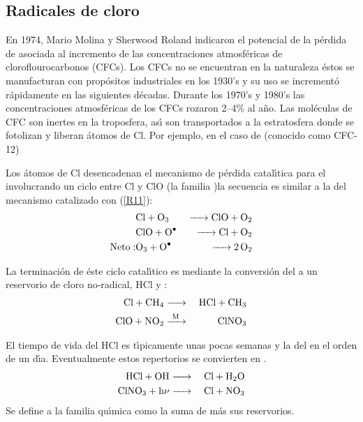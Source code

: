 \subsection{Radicales de cloro}\label{rclo}
En 1974, Mario Molina y Sherwood Roland indicaron el potencial de la p\'erdida de  asociada al incremento de las concentraciones atmosf\'ericas de cloroflourocarbonos (CFCs). Los CFCs no se encuentran en la naturaleza \'estos se manufacturan con prop\'ositos industriales en los 1930's  y su uso se increment\'o r\'apidamente en las siguientes d\'ecadas. Durante los 1970's y 1980's las concentraciones atmosf\'ericas de los CFCs rozaron 2--4\% al a\~no. Las mol\'eculas de CFC son inertes en la troposfera,  as\'{\i} son transportados a la estratosfera donde se fotolizan y liberan \'atomos de Cl. Por ejemplo, en el caso de  (conocido como CFC-12) 

Los \'atomos de Cl  desencadenan el mecanismo de p\'erdida catal\'{\i}tica para el  involucrando un ciclo entre Cl y ClO (la familia )la secuencia es similar a la del mecanismo catalizado con  (\ref{R11}):
\begin{eqnarray*}
            & \ce{Cl + O3     &->   ClO + O2}  \\
            &\ce{ClO +  O^.   & ->   Cl + O2 }  \\
  \mathrm{Neto: } &\ce{O3 + O^.   &->  2O2} 
\end{eqnarray*}

La terminaci\'on de \'este ciclo catal\'{\i}tico es mediante la conversi\'on del  a un reservorio de cloro no-radical, HCl y :
\begin{eqnarray*}
 \ce{Cl + CH4   & ->   & HCl + CH3 \\
       ClO + NO2        &  ->[M]  & ClNO3}
\end{eqnarray*}

El tiempo de vida del HCl es t\'{\i}picamente unas pocas semanas y la del  en el orden de un d\'{\i}a. Eventualmente estos repertorios se convierten en .
\begin{eqnarray*}
 \ce{HCl + OH   & ->   & Cl + H2O \\
       ClNO3 +   h$\nu$   &  ->  & Cl + NO3}
\end{eqnarray*}
Se define a la familia qu\'{\i}mica  como la suma de  m\'as sus reservorios.   

